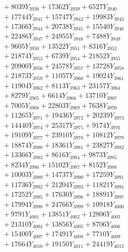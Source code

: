 \documentclass[a4paper,10pt]{article}
\begin{document}
{\begin{align}
&\;  + 8039 Y_{3938} + 17362 Y_{3939} + 6527 Y_{3940} \\[0.3ex]
&\;  + 17744 Y_{3941} + 15747 Y_{3942} + 19983 Y_{3943} \\[0.3ex]
&\;  + 17366 Y_{3944} + 20738 Y_{3945} + 15540 Y_{3946} \\[0.3ex]
&\;  + 22486 Y_{3947} + 24955 Y_{3948} + 7488 Y_{3949} \\[0.3ex]
&\;  + 9605 Y_{3950} + 13522 Y_{3951} + 8316 Y_{3952} \\[0.3ex]
&\;  + 21874 Y_{3953} + 6739 Y_{3954} + 21852 Y_{3955} \\[0.3ex]
&\;  + 20900 Y_{3956} + 24578 Y_{3957} + 13728 Y_{3958} \\[0.5ex]\allowbreak
&\;  + 21873 Y_{3959} + 11057 Y_{3960} + 19024 Y_{3961} \\[0.3ex]
&\;  + 11904 Y_{3962} + 8113 Y_{3963} + 23157 Y_{3964} \\[0.3ex]
&\;  + 8279 Y_{3965} + 6614 Y_{3966} + 13710 Y_{3967} \\[0.3ex]
&\;  + 7005 Y_{3968} + 22803 Y_{3969} + 7638 Y_{3970} \\[0.3ex]
&\;  + 11265 Y_{3971} + 19436 Y_{3972} + 20239 Y_{3973} \\[0.3ex]
&\;  + 14440 Y_{3974} + 25317 Y_{3975} + 9174 Y_{3976} \\[0.3ex]
&\;  + 19109 Y_{3977} + 23910 Y_{3978} + 10812 Y_{3979} \\[0.3ex]
&\;  + 18874 Y_{3980} + 18361 Y_{3981} + 23827 Y_{3982} \\[0.3ex]
&\;  + 13366 Y_{3983} + 8616 Y_{3984} + 9873 Y_{3985} \\[0.3ex]
&\;  + 8234 Y_{3986} + 15102 Y_{3987} + 8152 Y_{3988} \\[0.5ex]\allowbreak
&\;  + 10003 Y_{3989} + 14737 Y_{3990} + 17259 Y_{3991} \\[0.3ex]
&\;  + 11736 Y_{3992} + 21204 Y_{3993} + 11821 Y_{3994} \\[0.3ex]
&\;  + 17252 Y_{3995} + 17630 Y_{3996} + 18891 Y_{3997} \\[0.3ex]
&\;  + 17994 Y_{3998} + 24766 Y_{3999} + 10918 Y_{4000} \\[0.3ex]
&\;  + 9791 Y_{4001} + 13851 Y_{4002} + 12806 Y_{4003} \\[0.3ex]
&\;  + 21310 Y_{4004} + 13856 Y_{4005} + 8706 Y_{4006} \\[0.3ex]
&\;  + 15400 Y_{4007} + 17491 Y_{4008} + 7710 Y_{4009} \\[0.3ex]
&\;  + 17664 Y_{4010} + 19150 Y_{4011} + 24419 Y_{4012} \\[0.3ex]

\end{align}}
\end{document}
